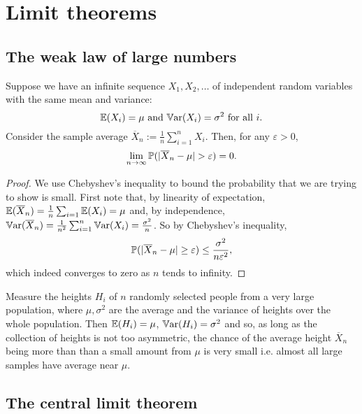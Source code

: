 \documentclass[10pt, a4paper]{article}
\begin{document}
\newpage

\section{Limit theorems}

\subsection{The weak law of large numbers}
\begin{theorem}
    Suppose we have an infinite sequence $X_1, X_2, \dotsc$ of independent random variables with the same mean and variance:
    \[
    \E(X_i) = \mu\text{ and }\Var(X_i) = \sigma ^ 2\text{ for all } i.
    \]
    Consider the sample average $\overline{X}_n := \frac{1}{n}\sum_{i = 1}^{n}X_i$.
    Then,
    for any $\varepsilon > 0$,
    \[
    \lim_{n \rightarrow \infty}\P(|\overline{X}_n - \mu| > \varepsilon) = 0.
    \]
    \begin{proof}
        We use Chebyshev's inequality to bound the probability that we are trying to show is small.
        First note that,
        by linearity of expectation,
        $\E(\overline{X}_n) = \frac{1}{n}\sum_{i = 1}\E(X_i) = \mu$ and,
        by independence,
        $\Var(\overline{X}_n) = \frac{1}{n ^ 2}\sum_{i = 1}^{n}\Var(X_i) = \frac{\sigma ^ 2}{n}$.
        So by Chebyshev's inequality,
        \[
        \P(|\overline{X}_n - \mu| \geq \varepsilon) \leq \frac{\sigma ^ 2}{n\varepsilon ^ 2},
        \]
        which indeed converges to zero as $n$ tends to infinity.
    \end{proof}
\end{theorem}

\begin{example}
    Measure the heights $H_i$ of $n$ randomly selected people from a very large population,
    where $\mu, \sigma ^ 2$ are the average and the variance of heights over the whole population.
    Then $\E(H_i) = \mu$,
    $\Var(H_i) = \sigma ^ 2$ and so,
    as long as the collection of heights is not too asymmetric,
    the chance of the average height $\overline{X}_n$ being more than than a small amount from $\mu$ is very small i.e. almost all large samples have average near $\mu$.
\end{example}

\subsection{The central limit theorem}
\end{document}
